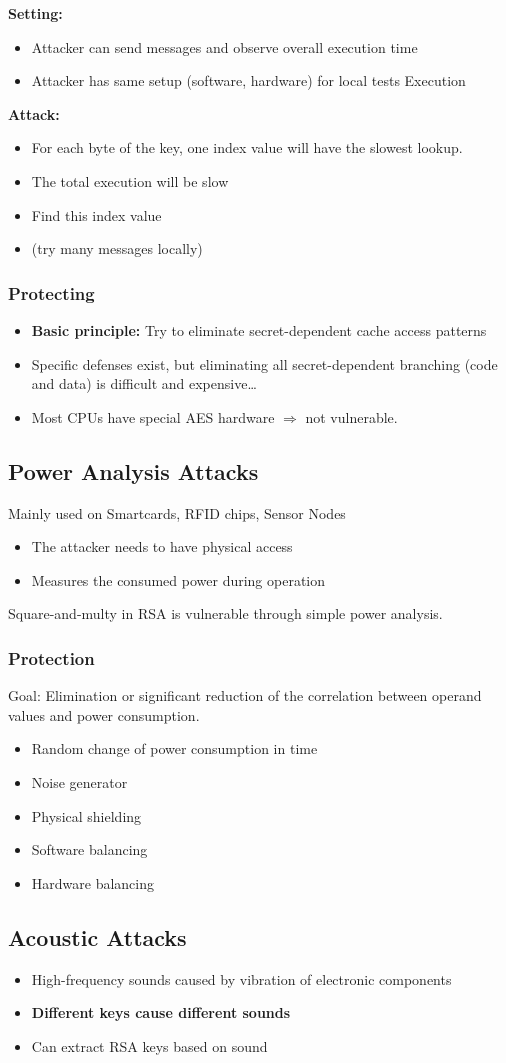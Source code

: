 \textbf{Setting:}
\begin{itemize}
\item Attacker can send messages and observe overall execution time
\item Attacker has same setup (software, hardware) for local tests
Execution
\end{itemize}

\textbf{Attack:}
\begin{itemize}
\item For each byte of the key, one index value will have the slowest lookup.
\item The total execution will be slow
\item Find this index value
\item (try many messages locally)
\end{itemize}


\subsubsection{Protecting}
\begin{itemize}
  \item \textbf{Basic principle:}
    Try to eliminate secret-dependent cache access patterns
  \item Specific defenses exist, but eliminating all secret-dependent
    branching (code and data) is difficult and expensive…
  \item Most CPUs have special AES hardware  $\Rightarrow$ not vulnerable.
\end{itemize}

\subsection{Power Analysis Attacks}
Mainly used on Smartcards, RFID chips, Sensor Nodes
\begin{itemize}
  \item The attacker needs to have physical access
  \item Measures the consumed power during  operation
\end{itemize}
Square-and-multy in RSA is vulnerable through simple power analysis.
\subsubsection{Protection}
Goal: Elimination or significant reduction of the correlation between operand
values and power consumption.
\begin{itemize}
	\item Random change of power consumption in time
	\item Noise generator
	\item Physical shielding
	\item Software balancing
	\item Hardware balancing
\end{itemize}

\subsection{Acoustic Attacks}
\begin{itemize}
	\item High-frequency sounds caused by vibration of
electronic components
\item \textbf{Different keys cause different sounds}
  \item Can extract RSA keys based on sound
\end{itemize}

